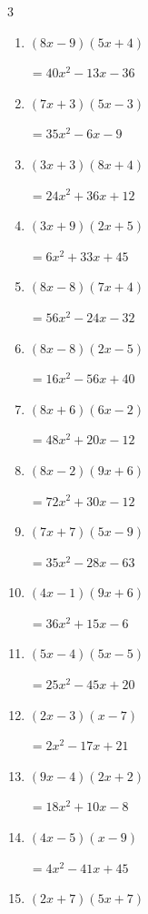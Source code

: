 \begin{multicols}{3}
\begin{enumerate}
        $=7x^{2}-33x-10$

\columnbreak %

  \item $(8x-9)(5x+4)$

        $=40x^{2}-13x-36$

  \item $(7x+3)(5x-3)$

        $=35x^{2}-6x-9$

  \item $(3x+3)(8x+4)$

        $=24x^{2}+36x+12$

  \item $(3x+9)(2x+5)$

        $=6x^{2}+33x+45$

  \item $(8x-8)(7x+4)$

        $=56x^{2}-24x-32$

  \item $(8x-8)(2x-5)$

        $=16x^{2}-56x+40$

  \item $(8x+6)(6x-2)$

        $=48x^{2}+20x-12$

  \item $(8x-2)(9x+6)$

        $=72x^{2}+30x-12$

  \item $(7x+7)(5x-9)$

        $=35x^{2}-28x-63$

  \item $(4x-1)(9x+6)$

        $=36x^{2}+15x-6$

  \item $(5x-4)(5x-5)$

        $=25x^{2}-45x+20$

  \item $(2x-3)(x-7)$

        $=2x^{2}-17x+21$

  \item $(9x-4)(2x+2)$

        $=18x^{2}+10x-8$

  \item $(4x-5)(x-9)$

        $=4x^{2}-41x+45$

  \item $(2x+7)(5x+7)$


\end{enumerate}
\end{multicols}
